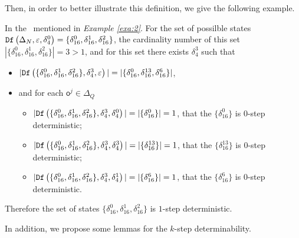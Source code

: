  Then, in order to better illustrate this definition, we give the following example.
\begin{example}
In the \BCN\ mentioned in {\em Example \ref{exa:2}}. For the set of possilble states ${\tt Df}\left(\Delta_N,\varepsilon,\delta_4^0\right)=\{\delta_{16}^0,\delta_{16}^1,\delta_{16}^2\}$, the cardinality number of this set $|\{\delta_{16}^0,\delta_{16}^1,\delta_{16}^2\}|=3>1$, and for this set there exists $\delta_{4}^3$ such that 
 \begin{itemize}
 \item  $|{\tt Df}\left(\{\delta_{16}^0,\delta_{16}^1,\delta_{16}^2\},\delta_{4}^3,\varepsilon\right)|=|\{\delta_{16}^0,\delta_{16}^{13},\delta_{16}^6\}|$,
 \item   and for each $\mathsf{o}^{j}\in \Delta_Q$
  \begin{itemize}
  \item   $|{\tt Df}\left(\{\delta_{16}^0,\delta_{16}^1,\delta_{16}^2\},\delta_{4}^3,\delta_{4}^0\right)|=|\{\delta_{16}^0\}|=1$, that the $\{\delta_{16}^0\}$ is $0$-step deterministic;
 \item  $|{\tt Df}\left(\{\delta_{16}^0,\delta_{16}^1,\delta_{16}^2\},\delta_{4}^3,\delta_{4}^3\right)|=|\{\delta_{16}^{13}\}|=1$, that the $\{\delta_{16}^{13}\}$ is $0$-step deterministic;
  \item  $|{\tt Df}\left(\{\delta_{16}^0,\delta_{16}^1,\delta_{16}^2\},\delta_{4}^3,\delta_{4}^1\right)|=|\{\delta_{16}^{6}\}|=1$, that the $\{\delta_{16}^{6}\}$ is $0$-step deterministic.
 \end{itemize}
 \end{itemize}
 Therefore the set of states $\{\delta_{16}^0,\delta_{16}^1,\delta_{16}^2\}$ is $1$-step deterministic.
\label{exa:9}
\end{example}  

In addition, we propose some lemmas for the $k$-step determinability.

